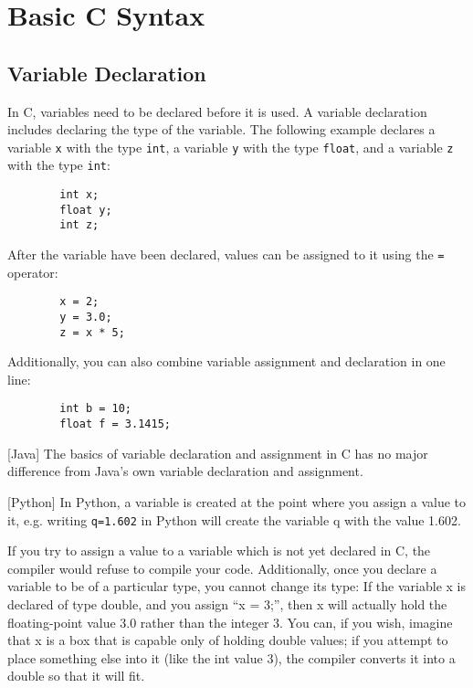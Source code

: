 
\chapter{Basic C Syntax}
    \section{Variable Declaration}
    In C, variables need to be declared before it is used. A variable declaration includes declaring the type of the variable. The following example declares a variable \texttt{x} with the type \texttt{int}, a variable \texttt{y} with the type \texttt{float}, and a variable \texttt{z} with the type \texttt{int}:
    \begin{verbatim}
        int x;
        float y;
        int z;
    \end{verbatim}
    After the variable have been declared, values can be assigned to it using the \verb|=| operator:
    \begin{verbatim}
        x = 2;
        y = 3.0;
        z = x * 5;
    \end{verbatim}
    Additionally, you can also combine variable assignment and declaration in one line:
    \begin{verbatim}
        int b = 10;
        float f = 3.1415;
    \end{verbatim}

    [Java]
    The basics of variable declaration and assignment in C has no major difference from Java's own variable declaration and assignment.
    
    [Python]
    In Python, a variable is created at the point where you assign a value to it, e.g. writing \texttt{q=1.602} in Python will create the variable q with the value 1.602. 
    
    If you try to assign a value to a variable which is not yet declared in C, the compiler would refuse to compile your code. Additionally, once you declare a variable to be of a particular type, you cannot change its type: If the variable x is declared of type double, and you assign “x = 3;”, then x will actually hold the floating-point value 3.0 rather than the integer 3. You can, if you wish, imagine that x is a box that is capable only of holding double values; if you attempt to place something else into it (like the int value 3), the compiler converts it into a double so that it will fit. %


